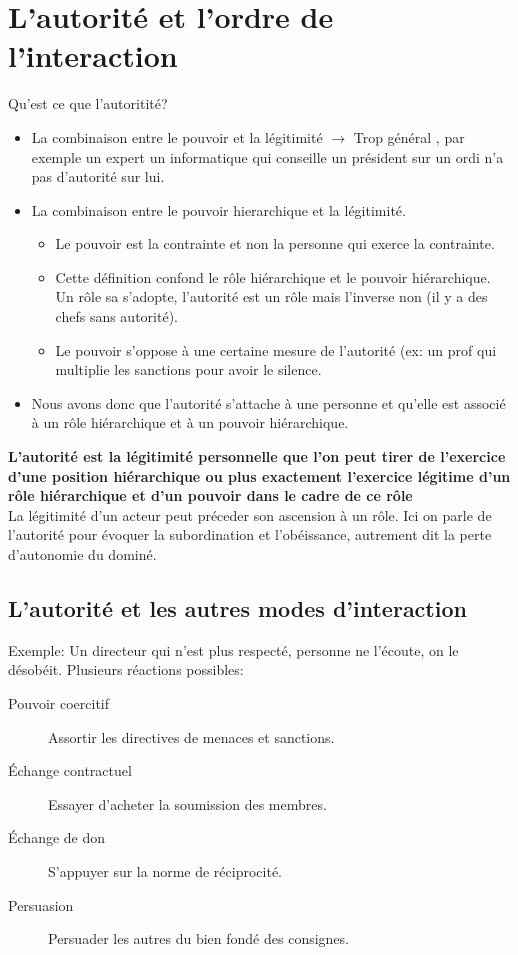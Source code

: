 \documentclass[11pt]{article} %
\begin{document}
\section{L'autorité et l'ordre de l'interaction}
	Qu'est ce que l'autoritité?
	\begin{itemize}
		\item La combinaison entre le pouvoir et la légitimité $\to$ Trop général , par exemple
		un expert un informatique qui conseille un président sur un ordi n'a pas d'autorité sur lui.
		\item La combinaison entre le pouvoir hierarchique et la légitimité.
			\begin{itemize}
				\item Le pouvoir est la contrainte et non la personne qui exerce la contrainte.
				\item Cette définition confond le rôle hiérarchique et le pouvoir hiérarchique. Un 
				rôle sa s'adopte, l'autorité est un rôle mais l'inverse non (il y a des chefs sans autorité).
				\item Le pouvoir s'oppose à une certaine mesure de l'autorité (ex: un prof qui multiplie
				les sanctions pour avoir le silence.
			\end{itemize}
		\item Nous avons donc que l'autorité s'attache à une personne et qu'elle est associé à un rôle 
		hiérarchique et à un pouvoir hiérarchique.	
	\end{itemize}
	\textbf{L'autorité est la légitimité personnelle que l'on peut tirer de l'exercice d'une position hiérarchique
	ou plus exactement l'exercice légitime d'un rôle hiérarchique et d'un pouvoir dans le cadre de ce rôle}
	\\ La légitimité d'un acteur peut préceder son ascension à un rôle. Ici on parle de l'autorité pour évoquer
	la subordination et l'obéissance, autrement dit la perte d'autonomie du dominé.
	\subsection{L'autorité et les autres modes d'interaction}
	Exemple: Un directeur qui n'est plus respecté, personne ne l'écoute, on le désobéit. Plusieurs réactions
	possibles:
	\begin{description}
		\item[Pouvoir coercitif] Assortir les directives de menaces et sanctions.
		\item[Échange contractuel] Essayer d'acheter la soumission des membres.
		\item[Échange de don] S'appuyer sur la norme de réciprocité.
		\item[Persuasion] Persuader les autres du bien fondé des consignes. 
	\end{description}
\end{document}
